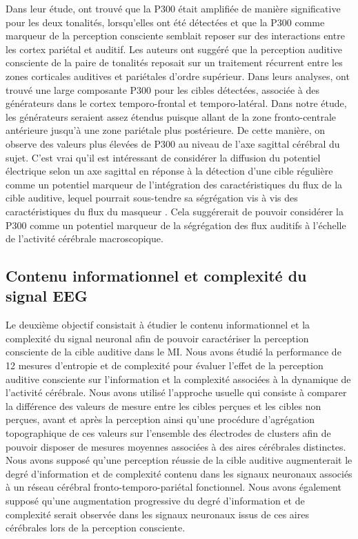 Dans leur étude, \cite{giani2015detecting} ont trouvé que la P300 était amplifiée de manière significative pour les deux tonalités, lorsqu'elles ont été détectées et que la P300 comme marqueur de la perception consciente semblait reposer sur des interactions entre les cortex pariétal et auditif. 
Les auteurs ont suggéré que la perception auditive consciente de la paire de tonalités reposait sur un traitement récurrent entre les zones corticales auditives et pariétales d'ordre supérieur. 
Dans leurs analyses, \cite{dykstra2016neural} ont trouvé une large composante P300 pour les cibles détectées, associée à des générateurs dans le cortex temporo-frontal et temporo-latéral. 
Dans notre étude, les générateurs seraient assez étendus puisque allant de la zone fronto-centrale antérieure jusqu'à une zone pariétale plus postérieure. 
De cette manière, on observe des valeurs plus élevées de P300 au niveau de l'axe sagittal cérébral du sujet. 
C'est vrai qu'il est intéressant de considérer la diffusion du potentiel électrique selon un axe sagittal en réponse à la détection d'une cible régulière comme un potentiel marqueur de l'intégration des caractéristiques du flux de la cible auditive, lequel pourrait sous-tendre sa ségrégation vis à vis des caractéristiques du flux du masqueur \citep{dykstra2016neural, giani2015detecting}. 
Cela suggérerait de pouvoir considérer la P300 comme un potentiel marqueur de la ségrégation des flux auditifs à l'échelle de l'activité cérébrale macroscopique. 

\subsection{Contenu informationnel et complexité du signal EEG}

Le deuxième objectif consistait à étudier le contenu informationnel et la complexité du signal neuronal afin de pouvoir caractériser la perception consciente de la cible auditive dans le MI. 
Nous avons étudié la performance de 12 mesures d'entropie et de complexité pour évaluer l'effet de la perception auditive consciente sur l'information et la complexité associées à la dynamique de l'activité cérébrale. 
Nous avons utilisé l'approche usuelle qui consiste à comparer la différence des valeurs de mesure entre les cibles perçues et les cibles non perçues, avant et après la perception ainsi qu'une procédure d'agrégation topographique de ces valeurs sur l'ensemble des électrodes de clusters afin de pouvoir disposer de mesures moyennes associées à des aires cérébrales distinctes. 
Nous avons supposé qu'une perception réussie de la cible auditive augmenterait le degré d'information et de complexité contenu dans les signaux neuronaux associés à un réseau cérébral fronto-temporo-pariétal fonctionnel. 
Nous avons également supposé qu'une augmentation progressive du degré d'information et de complexité serait observée dans les signaux neuronaux issus de ces aires cérébrales lors de la perception consciente. 

